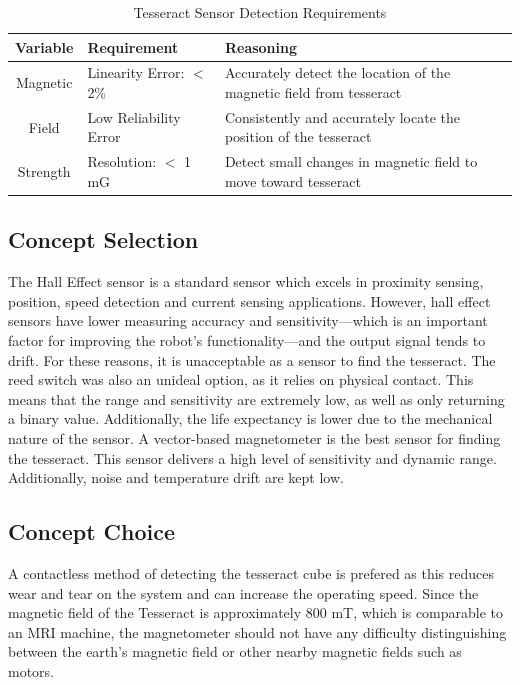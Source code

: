 \documentclass[12pt]{article}
\begin{document}
\begin{table}[htbp]
  \centering
  \caption{Tesseract Sensor Detection Requirements}
    \begin{tabular}{c|p{11.5em}|p{29.89em}}
    \multicolumn{1}{p{5.5em}|}{\textbf{Variable}} & \textbf{Requirement} & \textbf{Reasoning} \bigstrut[b]\\
    \hline
    Magnetic & Linearity Error: $<$ 2\% & Accurately detect the location of the magnetic field from tesseract \bigstrut[t]\\
    Field  & Low Reliability Error & Consistently and accurately locate the position of the tesseract \\
    Strength & Resolution: $<$ 1 mG & Detect small changes in magnetic field to move toward tesseract \\
    \end{tabular}%
  \label{tab:addlabel}%
\end{table}%


\subsection{Concept Selection}
The Hall Effect sensor is a standard sensor which excels in proximity sensing, position, speed detection and current sensing applications. However, hall effect sensors have lower measuring accuracy and sensitivity—which is an important factor for improving the robot’s functionality—and the output signal tends to drift. For these reasons, it is unacceptable as a sensor to find the tesseract.
The reed switch was also an unideal option, as it relies on physical contact. This means that the range and sensitivity are extremely low, as well as only returning a binary value. Additionally, the life expectancy is lower due to the mechanical nature of the sensor.
A vector-based magnetometer is the best sensor for finding the tesseract. This sensor delivers a high level of sensitivity and dynamic range. Additionally, noise and temperature drift are kept low. 

\subsection{Concept Choice}
A contactless method of detecting the tesseract cube is prefered as this reduces wear and tear on the system and can increase the operating speed. Since the magnetic field of the Tesseract is approximately 800 mT, which is comparable to an MRI machine, the magnetometer should not have any difficulty distinguishing between the earth’s magnetic field or other nearby magnetic fields such as motors.
\end{document}
